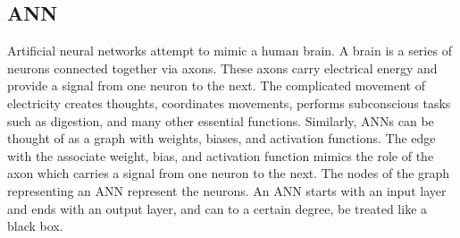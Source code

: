 \subsection{ANN}
Artificial neural networks attempt to mimic a human brain. A brain is a series of neurons connected together via axons. These axons carry electrical energy and provide a signal from one neuron to the next. The complicated movement of electricity creates thoughts, coordinates movements, performs subconscious tasks such as digestion, and many other essential functions. Similarly, ANNs can be thought of as a graph with weights, biases, and activation functions. The edge with the associate weight, bias, and activation function mimics the role of the axon which carries a signal from one neuron to the next. The nodes of the graph representing an ANN represent the neurons. An ANN starts with an input layer and ends with an output layer, and can to a certain degree, be treated like a black box.